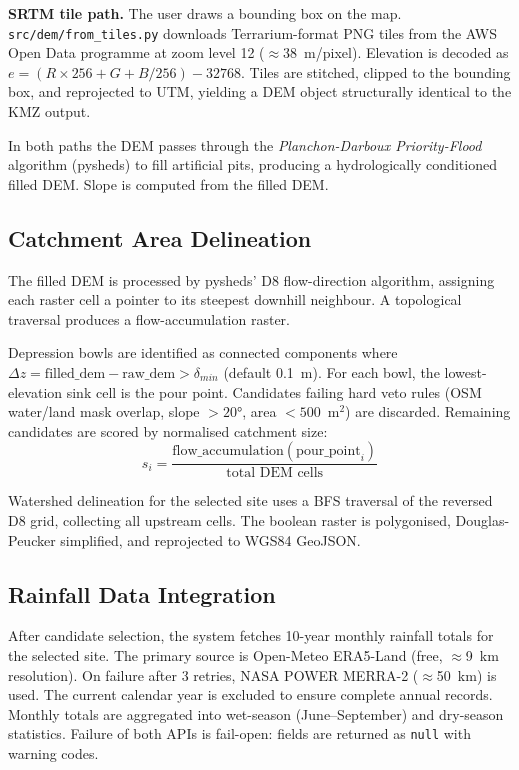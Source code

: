 \documentclass[manuscript,screen,review,nonacm]{acmart}
\begin{document}
\textbf{SRTM tile path.} The user draws a bounding box on the map.
\texttt{src/dem/from\_tiles.py} downloads Terrarium-format PNG tiles from
the AWS Open Data programme at zoom level 12 ($\approx$38~m/pixel).
Elevation is decoded as $e = (R\times256 + G + B/256) - 32768$. Tiles
are stitched, clipped to the bounding box, and reprojected to UTM,
yielding a DEM object structurally identical to the KMZ output.

In both paths the DEM passes through the \emph{Planchon-Darboux
Priority-Flood} algorithm (pysheds) to fill artificial pits, producing a
hydrologically conditioned filled DEM. Slope is computed from the filled
DEM.

\subsection{Catchment Area Delineation}

The filled DEM is processed by pysheds' D8 flow-direction algorithm,
assigning each raster cell a pointer to its steepest downhill neighbour.
A topological traversal produces a flow-accumulation raster.

Depression bowls are identified as connected components where
$\Delta z = \text{filled\_dem} - \text{raw\_dem} > \delta_{min}$
(default 0.1~m). For each bowl, the lowest-elevation sink cell is the
pour point. Candidates failing hard veto rules (OSM water/land mask
overlap, slope $>20°$, area $< 500$~m$^2$) are discarded. Remaining
candidates are scored by normalised catchment size:
\[
  s_i = \frac{\text{flow\_accumulation}(\text{pour\_point}_i)}{\text{total DEM cells}}
\]

Watershed delineation for the selected site uses a BFS traversal of the
reversed D8 grid, collecting all upstream cells. The boolean raster is
polygonised, Douglas-Peucker simplified, and reprojected to WGS84 GeoJSON.

\subsection{Rainfall Data Integration}

After candidate selection, the system fetches 10-year monthly rainfall
totals for the selected site. The primary source is Open-Meteo ERA5-Land
(free, $\approx$9~km resolution). On failure after 3 retries, NASA POWER
MERRA-2 ($\approx$50~km) is used. The current calendar year is excluded
to ensure complete annual records. Monthly totals are aggregated into
wet-season (June--September) and dry-season statistics. Failure of both
APIs is fail-open: fields are returned as \texttt{null} with warning codes.
\end{document}
